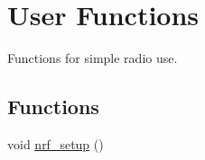 \hypertarget{group___user_func}{}\section{User Functions}
\label{group___user_func}


Functions for simple radio use.  


\subsection*{Functions}
\begin{DoxyCompactItemize}
\item 
void \hyperlink{group___user_func_gaf022f4a6e0c8d5bfee1f88bc868759d6}{nrf\+\_\+setup} ()\hypertarget{group___user_func_gaf022f4a6e0c8d5bfee1f88bc868759d6}{}\label{group___user_func_gaf022f4a6e0c8d5bfee1f88bc868759d6}


\end{DoxyCompactItemize}
